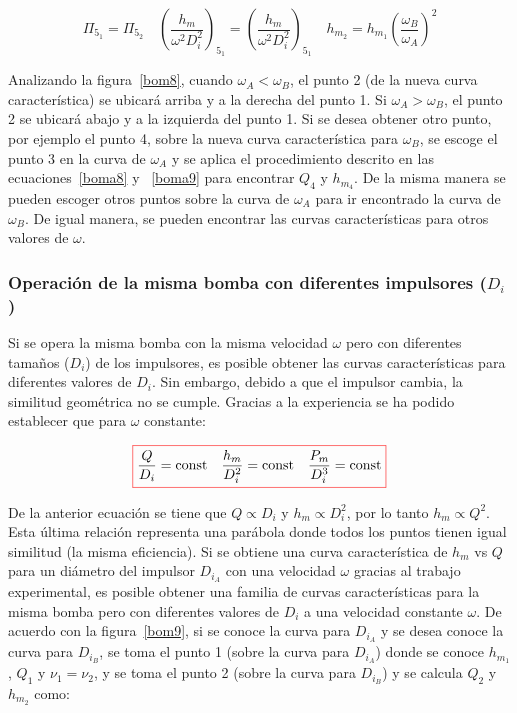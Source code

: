 \documentclass[11pt, oneside]{article}
\begin{document}
\begin{equation}
\Pi_{5_1} = \Pi_{5_2} \quad \left( \frac{h_m}{\omega^2 D_i^2} \right)_{5_1} = \left( \frac{h_m}{\omega^2 D_i^2} \right)_{5_1} \quad h_{m_2} = h_{m_1} \left(\frac{\omega_B}{\omega_A}\right)^2
\label{boma9}
\end{equation}


Analizando la figura~\ref{bom8}, cuando $\omega_A < \omega_B$, el punto 2 (de la nueva curva caracter\'istica) se ubicar\'a arriba y a la derecha del punto 1. Si $\omega_A > \omega_B$, el punto 2 se ubicar\'a abajo y a la izquierda del punto 1. Si se desea obtener otro punto, por ejemplo el punto 4, sobre la nueva curva caracter\'istica para $\omega_B$, se escoge el punto 3 en la curva de $\omega_A$ y se aplica el procedimiento descrito en las ecuaciones~\ref{boma8} y ~\ref{boma9} para encontrar $Q_4$ y $h_{m_4}$. De la misma manera se pueden escoger otros puntos sobre la curva de $\omega_A$ para ir encontrado la curva de $\omega_B$. De igual manera, se pueden encontrar las curvas caracter\'isticas para otros valores de $\omega$.


\subsubsection*{Operaci\'on de la misma bomba con diferentes impulsores ($D_i$)}
Si se opera la misma bomba con la misma velocidad $\omega$ pero con diferentes tama\~nos ($D_i$) de los impulsores, es posible obtener las curvas caracter\'isticas para diferentes valores de $D_i$. Sin embargo, debido a que el impulsor cambia, la similitud geom\'etrica no se cumple. Gracias a la experiencia se ha podido establecer que para $\omega$ constante:

\begin{equation}
\color{red}\boxed{\color{black} \frac{Q}{D_i} = \text{const} \quad \frac{h_m}{D_i^2}= \text{const}  \quad \frac{P_m}{D_i^3}= \text{const} }
\label{boma7}
\end{equation}

De la anterior ecuaci\'on se tiene que $Q \propto D_i$ y $h_m \propto D_i^2$, por lo tanto $h_m \propto Q^2$. Esta \'ultima relaci\'on representa una par\'abola donde todos los puntos tienen igual similitud (la misma eficiencia). Si se obtiene una curva caracter\'istica de $h_m$ vs $Q$ para un di\'ametro del impulsor $D_{i_A}$ con una velocidad $\omega$ gracias al trabajo experimental, es posible obtener una familia de curvas caracter\'isticas para la misma bomba pero con diferentes valores de $D_i$ a una velocidad constante $\omega$. De acuerdo con la figura~\ref{bom9}, si se conoce la curva para $D_{i_A}$ y se desea conoce la curva para $D_{i_B}$, se toma el punto 1 (sobre la curva para $D_{i_A}$) donde se conoce $h_{m_1}$, $Q_1$ y $\nu_1 = \nu_2$, y se toma el punto 2 (sobre la curva para $D_{i_B}$) y se calcula $Q_2$ y $h_{m_2}$ como:
\end{document}
